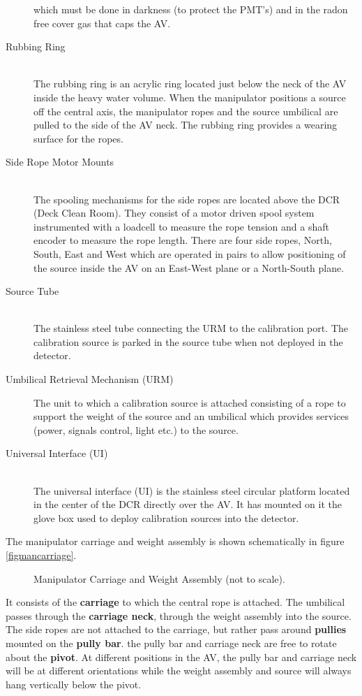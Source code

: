 \begin{description}
  which must be done in darkness
  (to protect the PMT's) and in the radon free cover gas that caps the AV.
\item[Rubbing Ring]~\\
  The rubbing ring is an acrylic ring located just below the neck of the AV 
  inside the heavy water volume.  When the manipulator positions a source 
  off the central axis, the manipulator ropes and the source umbilical are 
  pulled to the side of the AV neck. The rubbing ring provides a wearing 
  surface for the ropes.
\item[Side Rope Motor Mounts]~\\
  The spooling mechanisms for the side ropes are located above the DCR 
  (Deck Clean Room).  They consist of a motor driven spool system 
  instrumented with a loadcell to measure the rope tension and a shaft 
  encoder to measure the rope length.  There are four side ropes, North, 
  South, East and West which are operated in pairs to allow positioning
  of the source inside the AV on an East-West plane or a North-South plane.
\item[Source Tube]~\\
  The stainless steel tube connecting the URM to the calibration port.
  The calibration source is parked in the source tube when not deployed in
  the detector.
\item[Umbilical Retrieval Mechanism (URM)]
  The unit to which a calibration source is attached consisting of
  a rope to support the weight of the source and an umbilical which
  provides services (power, signals control, light etc.) to the
  source.
\item[Universal Interface (UI)]~\\
  The universal interface (UI) is the stainless steel circular platform located
  in the center of the DCR directly over the AV.  It has mounted on it the 
  glove box used to deploy calibration sources into the detector.
\end{description}
  
  The manipulator carriage and weight assembly is shown schematically
in figure \ref{figmancarriage}.
\begin{figure}[htbp]
\begin{center}
\leavevmode
\epsfxsize=3in
\caption[Manipulator Carriage]{
  }
  Manipulator Carriage and Weight Assembly (not to scale).
\end{center}
\end{figure}
It consists of the {\bf carriage} to which the central rope is
attached.  The umbilical passes through the {\bf carriage neck},
through the weight assembly into the source.  The side ropes are
not attached to the carriage, but rather pass around {\bf pullies}
mounted on the {\bf pully bar}.  the pully bar and carriage neck are
free to rotate about the {\bf pivot}.  At different positions in the
AV, the pully bar and carriage neck will be at different orientations
while the weight assembly and source will always hang vertically below
the pivot.
 
